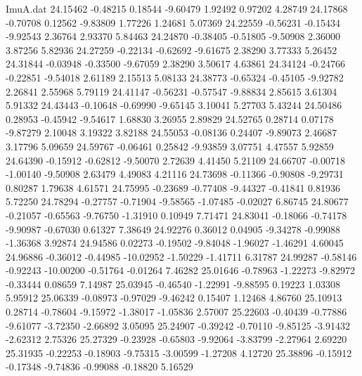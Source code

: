 \begin{filecontents}{ImuA.dat}
  24.15462   -0.48215    0.18544   -9.60479    1.92492    0.97202    4.28749
  24.17868   -0.70708    0.12562   -9.83809    1.77226    1.24681    5.07369
  24.22559   -0.56231   -0.15434   -9.92543    2.36764    2.93370    5.84463
  24.24870   -0.38405   -0.51805   -9.50908    2.36000    3.87256    5.82936
  24.27259   -0.22134   -0.62692   -9.61675    2.38290    3.77333    5.26452
  24.31844   -0.03948   -0.33500   -9.67059    2.38290    3.50617    4.63861
  24.34124   -0.24766   -0.22851   -9.54018    2.61189    2.15513    5.08133
  24.38773   -0.65324   -0.45105   -9.92782    2.26841    2.55968    5.79119
  24.41147   -0.56231   -0.57547   -9.88834    2.85615    3.61304    5.91332
  24.43443   -0.10648   -0.69990   -9.65145    3.10041    5.27703    5.43244
  24.50486    0.28953   -0.45942   -9.54617    1.68830    3.26955    2.89829
  24.52765    0.28714    0.07178   -9.87279    2.10048    3.19322    3.82188
  24.55053   -0.08136    0.24407   -9.89073    2.46687    3.17796    5.09659
  24.59767   -0.06461    0.25842   -9.93859    3.07751    4.47557    5.92859
  24.64390   -0.15912   -0.62812   -9.50070    2.72639    4.41450    5.21109
  24.66707   -0.00718   -1.00140   -9.50908    2.63479    4.49083    4.21116
  24.73698   -0.11366   -0.90808   -9.29731    0.80287    1.79638    4.61571
  24.75995   -0.23689   -0.77408   -9.44327   -0.41841    0.81936    5.72250
  24.78294   -0.27757   -0.71904   -9.58565   -1.07485   -0.02027    6.86745
  24.80677   -0.21057   -0.65563   -9.76750   -1.31910    0.10949    7.71471
  24.83041   -0.18066   -0.74178   -9.90987   -0.67030    0.61327    7.38649
  24.92276    0.36012    0.04905   -9.34278   -0.99088   -1.36368    3.92874
  24.94586    0.02273   -0.19502   -9.84048   -1.96027   -1.46291    4.60045
  24.96886   -0.36012   -0.44985  -10.02952   -1.50229   -1.41711    6.31787
  24.99287   -0.58146   -0.92243  -10.00200   -0.51764   -0.01264    7.46282
  25.01646   -0.78963   -1.22273   -9.82972   -0.33444    0.08659    7.14987
  25.03945   -0.46540   -1.22991   -9.88595    0.19223    1.03308    5.95912
  25.06339   -0.08973   -0.97029   -9.46242    0.15407    1.12468    4.86760
  25.10913    0.28714   -0.78604   -9.15972   -1.38017   -1.05836    2.57007
  25.22603   -0.40439   -0.77886   -9.61077   -3.72350   -2.66892    3.05095
  25.24907   -0.39242   -0.70110   -9.85125   -3.91432   -2.62312    2.75326
  25.27329   -0.23928   -0.65803   -9.92064   -3.83799   -2.27964    2.69220
  25.31935   -0.22253   -0.18903   -9.75315   -3.00599   -1.27208    4.12720
  25.38896   -0.15912   -0.17348   -9.74836   -0.99088   -0.18820    5.16529

\end{filecontents}
